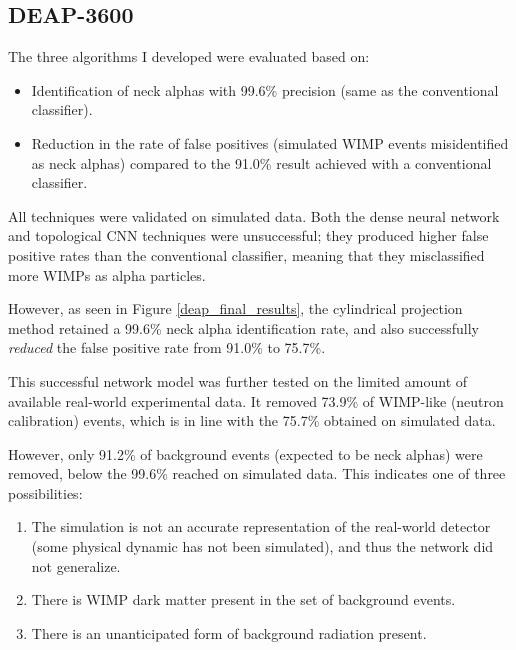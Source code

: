 \documentclass[12pt]{article}
\begin{document}
\subsection{DEAP-3600}

The three algorithms I developed were evaluated based on:

\begin{itemize}
    \item Identification of neck alphas with 99.6\% precision (same as the conventional classifier).
    \item Reduction in the rate of false positives (simulated WIMP events misidentified as neck alphas) compared to the 91.0\% result achieved with a conventional classifier.
\end{itemize}

All techniques were validated on simulated data. Both the dense neural network and topological CNN techniques were unsuccessful; they produced higher false positive rates than the conventional classifier, meaning that they misclassified more WIMPs as alpha particles.

However, as seen in Figure \ref{deap_final_results}, the cylindrical projection method retained a 99.6\% neck alpha identification rate, and also successfully \textit{reduced} the false positive rate from 91.0\% to 75.7\%.

This successful network model was further tested on the limited amount of available real-world experimental data. It removed 73.9\% of WIMP-like (neutron calibration) events, which is in line with the 75.7\% obtained on simulated data.

However, only 91.2\% of background events (expected to be neck alphas) were removed, below the 99.6\% reached on simulated data. This indicates one of three possibilities:

\begin{enumerate}
    \item The simulation is not an accurate representation of the real-world detector (some physical dynamic has not been simulated), and thus the network did not generalize.
    \item There is WIMP dark matter present in the set of background events.
    \item There is an unanticipated form of background radiation present.
\end{enumerate}
\end{document}
